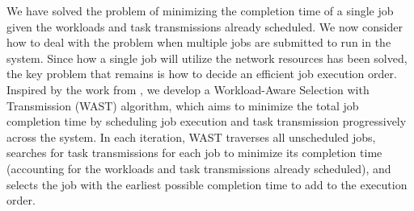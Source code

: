 We have solved the problem of minimizing the completion time of a single job given the workloads and task transmissions already scheduled. We now consider how to deal with the problem when multiple jobs are submitted to run in the system. Since how a single job will utilize the network resources has been solved, the key problem that remains is how to decide an efficient job execution order. Inspired by the work from \cite{hung2015scheduling}, we develop a Workload-Aware Selection with Transmission (WAST) algorithm, which aims to minimize the total job completion time by scheduling job execution and task transmission progressively across the system. 
In each iteration, WAST traverses all unscheduled jobs, searches for task transmissions for each job to minimize its completion time (accounting for the workloads and task transmissions already scheduled), and selects the job with the earliest possible completion time to add to the execution order. %
